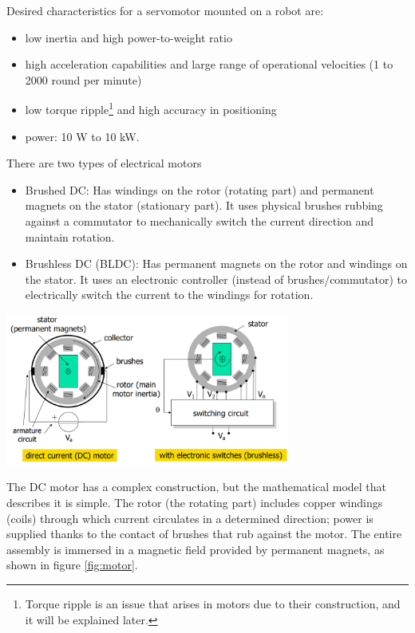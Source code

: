 \documentclass[10pt, letterpaper]{report}
\begin{document}
Desired characteristics for a servomotor mounted on a robot are:\begin{itemize}
    \item low inertia and high power-to-weight ratio
    \item high acceleration capabilities and large  range of operational velocities (1 to 2000 round per minute)
    \item low torque ripple\footnote{Torque ripple is an issue that arises in motors due to their construction, and it will be explained later.} and high accuracy in positioning
    \item power: 10 W to 10 kW.
\end{itemize}
There are two types of electrical motors\begin{itemize}
    \item Brushed DC: Has windings on the rotor (rotating part) and permanent magnets on the stator (stationary part). It uses physical brushes rubbing against a commutator to mechanically switch the current direction and maintain rotation.
    \item Brushless DC (BLDC): Has permanent magnets on the rotor and windings on the stator. It uses an electronic controller (instead of brushes/commutator) to electrically switch the current to the windings for rotation.
\end{itemize}\begin{center}
    \includegraphics[width=0.7\textwidth ]{images/brush_brushless.png} 
\end{center}


The DC motor has a complex construction, but the mathematical model that describes it is simple. The rotor (the rotating part) includes copper windings (coils) through which current circulates in a determined direction; power is supplied thanks to the contact of brushes that rub against the motor. The entire assembly is immersed in a magnetic field provided by permanent magnets, as shown in figure \ref{fig:motor}.\bigskip
\end{document}
